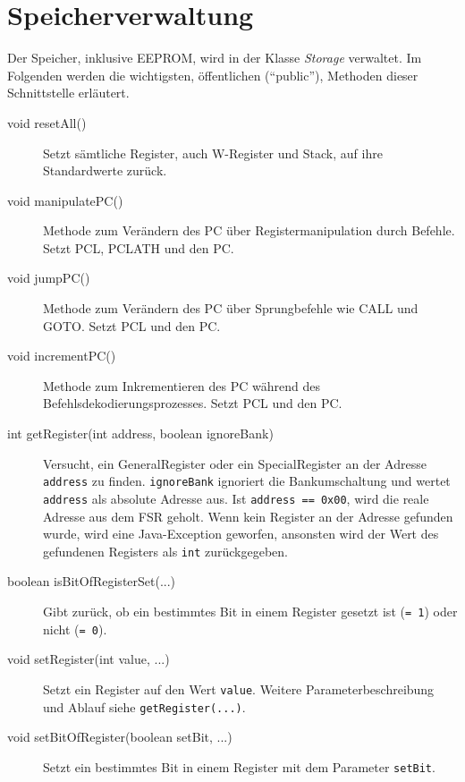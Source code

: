 \begin{description}
\end{description}


\section{Speicherverwaltung}

Der Speicher, inklusive EEPROM, wird in der Klasse \textit{Storage} verwaltet. Im Folgenden werden die wichtigsten, öffentlichen (\enquote{public}), Methoden dieser Schnittstelle erläutert.

\begin{description}
\item[void resetAll()]{Setzt sämtliche Register, auch W-Register und Stack, auf ihre Standardwerte zurück.}
\item[void manipulatePC()]{Methode zum Verändern des PC über Registermanipulation durch Befehle. Setzt PCL, PCLATH und den PC.}
\item[void jumpPC()]{Methode zum Verändern des PC über Sprungbefehle wie CALL und GOTO. Setzt PCL und den PC.}
\item[void incrementPC()]{Methode zum Inkrementieren des PC während des Befehlsdekodierungsprozesses. Setzt PCL und den PC.}
\item[int getRegister(int address, boolean ignoreBank)]{Versucht, ein GeneralRegister oder ein SpecialRegister an der Adresse \texttt{address} zu finden. \texttt{ignoreBank} ignoriert die Bankumschaltung und wertet \texttt{address} als absolute Adresse aus. Ist \texttt{address == 0x00}, wird die reale Adresse aus dem FSR geholt. Wenn kein Register an der Adresse gefunden wurde, wird eine Java-Exception geworfen, ansonsten wird der Wert des gefundenen Registers als \texttt{int} zurückgegeben.}
\item[boolean isBitOfRegisterSet(...)]{Gibt zurück, ob ein bestimmtes Bit in einem Register gesetzt ist (\texttt{= 1}) oder nicht (\texttt{= 0}).}
\item[void setRegister(int value, ...)]{Setzt ein Register auf den Wert \texttt{value}. Weitere Parameterbeschreibung und Ablauf siehe \texttt{getRegister(...)}.}
\item[void setBitOfRegister(boolean setBit, ...)]{Setzt ein bestimmtes Bit in einem Register mit dem Parameter \texttt{setBit}.}
\end{description}
